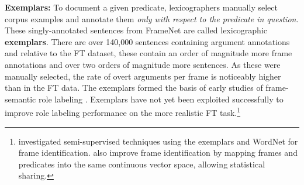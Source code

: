 \documentclass[11pt,a4paper]{article}
\newcommand{\ensuretext}[1]{#1}
\newcommand{\nssmarker}{\ensuretext{\textcolor{magenta}{\ensuremath{^{\textsc{NS}}_{\textsc{S}}}}}}
\newcommand{\mkmarker}{\ensuretext{\textcolor{red}{\ensuremath{^{\textsc{M}}_{\textsc{K}}}}}}
\newcommand{\stmarker}{\ensuretext{\textcolor{orange}{\ensuremath{^{\textsc{S}}_{\textsc{T}}}}}}
\newcommand{\arkcomment}[3]{\ensuretext{\textcolor{#3}{[#1 #2]}}}
\newcommand{\nss}[1]{\arkcomment{\nssmarker}{#1}{magenta}}
\newcommand{\mk}[1]{\arkcomment{\mkmarker}{#1}{red}}
\newcommand{\st}[1]{\arkcomment{\stmarker}{#1}{orange}}
\begin{document}
\noindent\textbf{Exemplars:} To document a given predicate, lexicographers manually select corpus examples and annotate them
\emph{only with respect to the predicate in question}.
These singly-annotated sentences from FrameNet are called lexicographic \textbf{exemplars}.
There are over 140,000 sentences containing argument annotations %
and relative to the FT dataset, these contain an order of magnitude more frame annotations
and over two orders of magnitude 
more sentences. As these were manually selected, the rate of overt arguments per frame
is noticeably higher than in the FT data.
The exemplars formed the basis of early studies of frame-semantic role
labeling \citep[e.g.,][]{gildea-02,thompson-03,fleischman-03,litkowski-04,kwon-04}.
Exemplars have not yet been exploited successfully to improve
role labeling performance on the more realistic FT task.\footnote{\citet{das-11,das-12} investigated semi-supervised techniques using the exemplars and WordNet for frame identification.
\citet{hermann-14} also improve frame identification by mapping frames
and predicates into the same continuous vector space, allowing
statistical sharing.}
\end{document}
